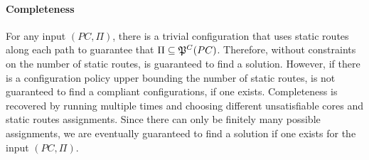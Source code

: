 \paragraph{Completeness}
For any input $(PC, \Pi)$, there is a trivial configuration that uses static
routes along each path to guarantee that  
$\Pi\subseteq\mathfrak{P}^C(PC)$. Therefore, without constraints on the
number of static routes, \name is guaranteed to find a solution.
However, if there is a configuration policy 
upper bounding the number of static routes,  is not guaranteed 
to find a compliant configurations, if one exists. 
Completeness is recovered by running  multiple times and choosing different
unsatisfiable cores and static routes assignments. Since there can only be finitely many
possible assignments, we are eventually 
guaranteed to find a solution if one exists for the input $(PC, \Pi)$.